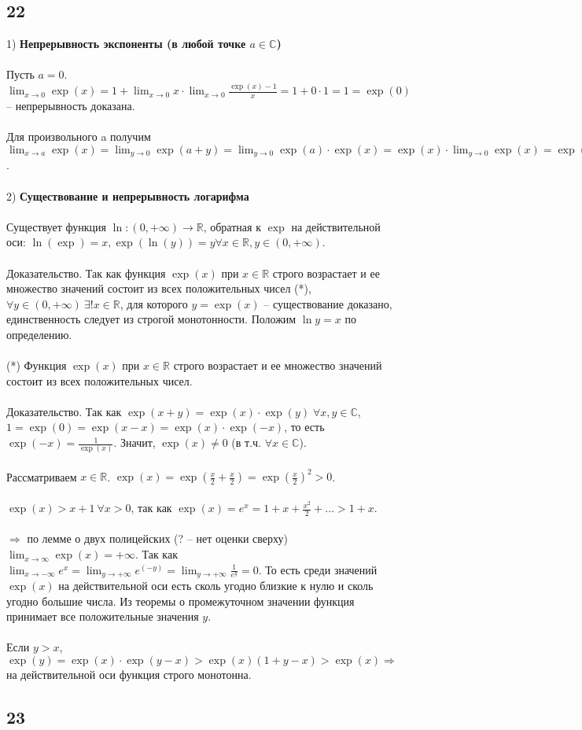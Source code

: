 		\subsection{22}
		1) \textbf{Непрерывность экспоненты (в любой точке $a \in \mathbb{C}$)}\\
		\\
		Пусть $a = 0$. $\lim_{x \to 0} \exp(x) = 1 + \lim_{x \to 0} x \cdot \lim_{x \to 0} \frac{\exp(x) - 1}{x} = 1 + 0 \cdot 1 = 1 = \exp(0)$ -- непрерывность доказана. \\
		\\
		Для произвольного a получим $\lim_{x \to a} \exp(x) = \lim_{y \to 0} \exp(a + y) = \lim_{y \to 0} \exp(a) \cdot \exp(x) = \exp(x) \cdot \lim_{y \to 0} \exp(x) = \exp(a)$. \\
		\\
		2) \textbf{Существование и непрерывность логарифма}\\
		\\
		Существует функция $\ln : (0, +\infty) \rightarrow \mathbb{R}$, обратная к $\exp$ на действительной оси: $\ln (\exp) = x, \exp(\ln (y)) = y \forall x \in \mathbb{R}, y \in (0, +\infty)$. \\
		\\
		Доказательство. Так как функция $\exp(x)$ при $x \in \mathbb{R}$ строго возрастает и ее множество значений состоит из всех положительных чисел (*), $\forall y \in (0, +\infty) \ \exists ! x \in \mathbb{R}$, для которого $y = \exp(x)$ -- существование доказано, единственность следует из строгой монотонности. Положим $\ln y = x$ по определению. \\
		\\
		(*) Функция $\exp(x)$ при $x \in \mathbb{R}$ строго возрастает и ее множество значений состоит из всех положительных чисел. \\
		\\
		Доказательство. Так как $\exp(x + y) = \exp(x) \cdot \exp(y) \; \forall x, y \in \mathbb{C}$, $1 = \exp(0) = \exp(x - x) = \exp(x) \cdot \exp(-x)$, то есть $\exp(-x) = \frac{1}{\exp(x)}$. Значит, $\exp(x) \neq 0$ (в т.ч. $\forall x \in \mathbb{C}$).\\ 
		\\
		Рассматриваем $x \in \mathbb{R}$. $\exp(x) = \exp(\frac{x}{2} + \frac{x}{2}) = \exp(\frac{x}{2})^2 > 0$. \\
		\\
		$\exp(x) > x + 1 \ \forall x > 0$, так как $\exp(x) = e^x = 1 + x + \frac{x^2}{2} + ... > 1 + x$. \\
		\\
		$\Rightarrow$ по лемме о двух полицейских (? -- нет оценки сверху) $\lim_{x \to \infty} \exp(x) = +\infty$. Так как $\lim_{x \to -\infty} e^x = \lim_{y \to +\infty} e^(-y) = \lim_{y \to +\infty} \frac{1}{e^{y}} = 0$. То есть среди значений $\exp(x)$ на действительной оси есть сколь угодно близкие к нулю и сколь угодно большие числа. Из теоремы о промежуточном значении функция принимает все положительные значения $y$. \\
		\\
		Если $y > x$, $\exp(y) = \exp(x) \cdot \exp(y - x) > \exp(x)(1 + y - x) > \exp(x) \Rightarrow$ на действительной оси функция строго монотонна. \\
		
		\subsection{23}
		
